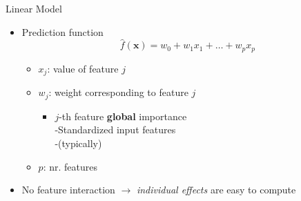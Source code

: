 \begin{frame}{Linear Model}
	\begin{itemize}\setlength\itemsep{2em}
		\item<1-> Prediction function
		\begin{equation}
			\hat{f}(\bm{x})=w_0+w_1 x_{1} + \dots + w_p x_ p
		\end{equation}
		\begin{itemize}\setlength\itemsep{0.5em}
			\item $x_j$: value of feature $j$
			\item $w_j$: weight corresponding to feature $j$
			\begin{itemize}\setlength\itemsep{0.5em}
				\item $j$-th feature \textbf{global} importance 
				\\-Standardized input features
				\\-(typically) 
			\end{itemize}
			\item $p$: nr. features
		\end{itemize}
		\item<2-> No feature interaction $\rightarrow$ \emph{individual effects} are easy to compute
	\end{itemize}
\end{frame}
